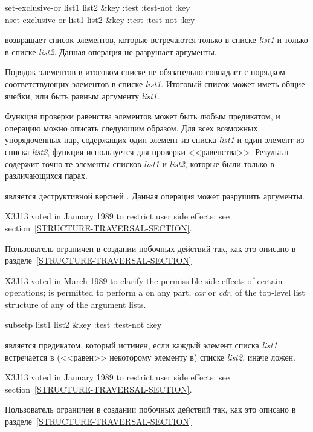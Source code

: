 \begin{defun}[Функция]
set-exclusive-or list1 list2 &key :test :test-not :key \\
nset-exclusive-or list1 list2 &key :test :test-not :key

 возвращает список элементов, которые встречаются только в
списке \emph{list1} и только в списке \emph{list2}.
Данная операция не разрушает аргументы.

Порядок элементов в итоговом списке не обязательно совпадает с порядком
соответствующих элементов в списке \emph{list1}.
Итоговый список может иметь общие ячейки, или быть равным  аргументу
\emph{list1}.

Функция проверки равенства элементов может быть любым предикатом, и операцию
 можно описать следующим образом. Для всех возможных
упорядоченных пар, содержащих один элемент из списка \emph{list1} и один элемент
из списка \emph{list2}, функция используется для проверки
<<равенства>>. Результат содержит точно те элементы списков \emph{list1} и
\emph{list2}, которые были только в различающихся парах.

 является деструктивной версией
. Данная операция может разрушить аргументы.

\begin{new}
X3J13 voted in January 1989
to restrict user side effects; see section~\ref{STRUCTURE-TRAVERSAL-SECTION}.
\end{new}

Пользователь ограничен в создании побочных действий так, как это описано в
разделе~\ref{STRUCTURE-TRAVERSAL-SECTION}

\begin{newer}
X3J13 voted in March 1989 
to clarify the permissible side effects of certain operations;
 is permitted to perform a  on any part,
\emph{car} or \emph{cdr}, of the top-level list structure of 
any of the argument lists.
\end{newer}
\end{defun}

\begin{defun}[Функция]
subsetp list1 list2 &key :test :test-not :key

 является предикатом, который истинен, если каждый элемент списка
\emph{list1} встречается в (<<равен>> некоторому элементу в) списке
\emph{list2}, иначе ложен.

\begin{new}
X3J13 voted in January 1989
to restrict user side effects; see section~\ref{STRUCTURE-TRAVERSAL-SECTION}.
\end{new}

Пользователь ограничен в создании побочных действий так, как это описано в
разделе~\ref{STRUCTURE-TRAVERSAL-SECTION}
\end{defun}

